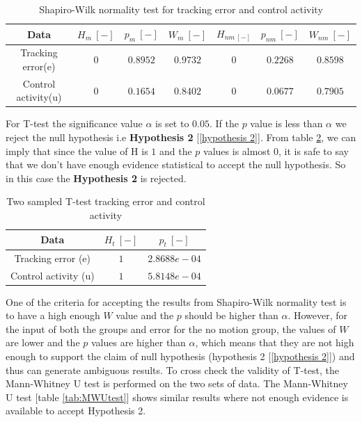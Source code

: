 \documentclass[conference]{IEEEtran}
\begin{document}
\begin{table}[!t]
    \centering
    \caption{Shapiro-Wilk normality test for tracking error and control activity}
    \begin{tabular}{c|c|c|c|c|c|c}
    
    Data& $H_m\ [-]$ & $p_m\ [-]$ & $W_m\ [-]$ & $H_{nm\ [-]}$  & $p_{nm}\ [-]$ & $W_{nm}\ [-]$ \\
    \hline
    \hline
    Tracking error(e) & $0$ & $0.8952$ & $0.9732$ & $0$ & $0.2268$ & $0.8598$\\
    Control activity(u) & $0$ & $0.1654$ & $0.8402$ & $0$ & $0.0677$ & $0.7905$\\
    \end{tabular}
    \label{tab:SWtest}
\end{table}


For T-test the significance value $\alpha$ is set to $0.05$. If the $p$ value is less than $\alpha$ we reject the null hypothesis i.e \textbf{Hypothesis 2} [\ref{hypothesis 2}]. From table \ref{tab:T2test}, we can imply that since the value of H is $1$ and the $p$ values is almost $0$, it is safe to say that we don't have enough evidence statistical to accept the null hypothesis. So in this case the \textbf{Hypothesis 2} is rejected.\\

\begin{table}[ht!]
    \centering
    \caption{Two sampled T-test tracking error and control activity}
    \begin{tabular}{c|c|c}
    Data & $H_t\ [-]$ & $p_t\ [-]$ \\
    \hline
    \hline
    Tracking error (e) & $1$ & $2.8688e-04$\\
    Control activity (u) & $1$ & $5.8148e-04$ \\
    \end{tabular}
    \label{tab:T2test}
\end{table}

One of the criteria for accepting the results from Shapiro-Wilk normality test is to have a high enough $W$ value and the $p$ should be higher than $\alpha$. However, for the input of both the groups and error for the no motion group, the values of $W$ are lower and the $p$ values are higher than $\alpha$, which means that they are not high enough to support the claim of null hypothesis (hypothesis 2 [\ref{hypothesis 2}]) and thus can generate ambiguous results. To cross check the validity of T-test, the Mann-Whitney U test is performed on the two sets of data. The Mann-Whitney U test [table \ref{tab:MWUtest}] shows similar results where not enough evidence is available to accept Hypothesis 2.\\
\end{document}
